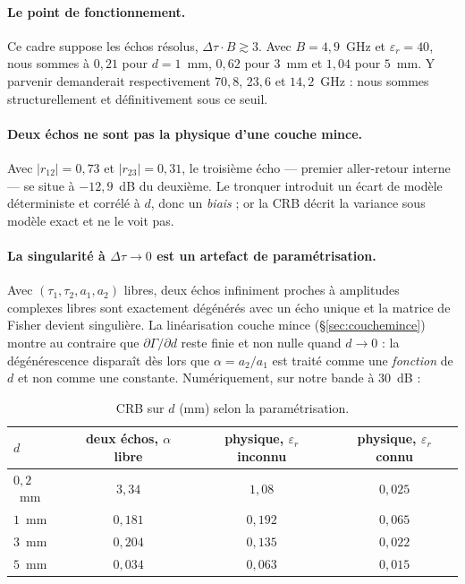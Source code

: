 \documentclass[11pt,a4paper]{article}
\newcommand{\eps}{\varepsilon_r}
\begin{document}
\paragraph{Le point de fonctionnement.} Ce cadre suppose les échos résolus,
$\Delta\tau \cdot B \gtrsim 3$. Avec $B = 4{,}9$~GHz et $\eps = 40$, nous sommes
à $0{,}21$ pour $d = 1$~mm, $0{,}62$ pour $3$~mm et $1{,}04$ pour $5$~mm. Y
parvenir demanderait respectivement $70{,}8$, $23{,}6$ et $14{,}2$~GHz : nous
sommes structurellement et définitivement sous ce seuil.

\paragraph{Deux échos ne sont pas la physique d'une couche mince.} Avec
$|r_{12}| = 0{,}73$ et $|r_{23}| = 0{,}31$, le troisième écho --- premier
aller-retour interne --- se situe à $-12{,}9$~dB du deuxième. Le tronquer
introduit un écart de modèle déterministe et corrélé à $d$, donc un
\emph{biais} ; or la CRB décrit la variance sous modèle exact et ne le voit pas.

\paragraph{La singularité à $\Delta\tau \to 0$ est un artefact de
paramétrisation.} Avec $(\tau_1,\tau_2,a_1,a_2)$ libres, deux échos infiniment
proches à amplitudes complexes libres sont exactement dégénérés avec un écho
unique et la matrice de Fisher devient singulière. La linéarisation couche mince
(\S\ref{sec:couchemince}) montre au contraire que $\partial\Gamma/\partial d$
reste finie et non nulle quand $d \to 0$ : la dégénérescence disparaît dès lors
que $\alpha = a_2/a_1$ est traité comme une \emph{fonction} de $d$ et non comme
une constante. Numériquement, sur notre bande à $30$~dB :

\begin{table}[h]
\centering
\caption{CRB sur $d$ (mm) selon la paramétrisation.}
\begin{tabular}{lccc}
\toprule
$d$ & deux échos, $\alpha$ libre & physique, $\eps$ inconnu
    & physique, $\eps$ connu \\
\midrule
$0{,}2$~mm & $3{,}34$  & $1{,}08$  & $0{,}025$ \\
$1$~mm     & $0{,}181$ & $0{,}192$ & $0{,}065$ \\
$3$~mm     & $0{,}204$ & $0{,}135$ & $0{,}022$ \\
$5$~mm     & $0{,}034$ & $0{,}063$ & $0{,}015$ \\
\bottomrule
\end{tabular}
\end{table}
\end{document}

